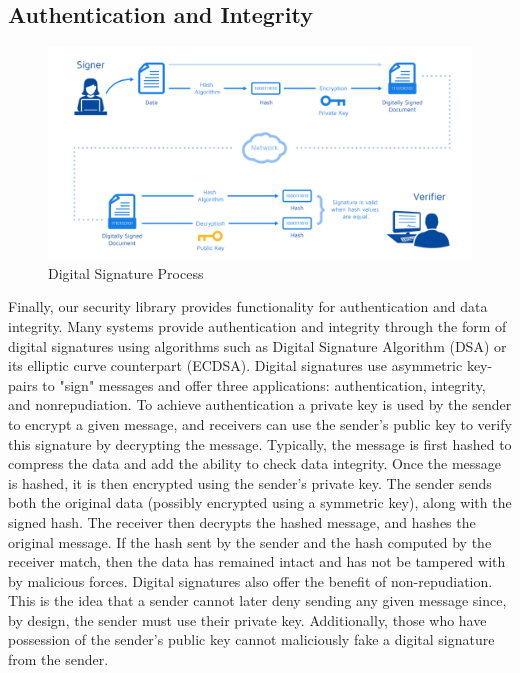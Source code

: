 \subsection{Authentication and Integrity}

 \begin{figure}[t]
	\centering
	\includegraphics[width=14cm,height=0.7\textheight,keepaspectratio]{./figures/figure_4}
	\center\caption[font=footnote]{Digital Signature Process}
\end{figure}

Finally, our security library provides functionality for authentication and data integrity. Many systems provide authentication and integrity through the form of digital signatures using algorithms such as Digital Signature Algorithm (DSA) or its elliptic curve counterpart (ECDSA). Digital signatures use asymmetric key-pairs to "sign" messages and offer three applications: authentication, integrity, and nonrepudiation. To achieve authentication a private key is used by the sender to encrypt a given message, and receivers can use the sender's public key to verify this signature by decrypting the message. Typically, the message is first hashed to compress the data and add the ability to check data integrity. Once the message is hashed, it is then encrypted using the sender's private key.  The sender sends both the original data (possibly encrypted using a symmetric key), along with the signed hash. The receiver then decrypts the hashed message, and hashes the original message. If the hash sent by the sender and the hash computed by the receiver match, then the data has remained intact and has not be tampered with by malicious forces. Digital signatures also offer the benefit of non-repudiation. This is the idea that a sender cannot later deny sending any given message since, by design, the sender must use their private key. Additionally, those who have possession of the sender's public key cannot maliciously fake a digital signature from the sender.

